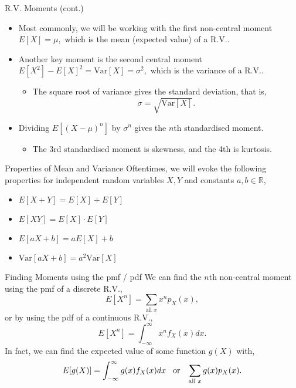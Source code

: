 \documentclass{beamer}
\begin{document}
\begin{frame}{R.V. Moments (cont.)}
    \begin{itemize}
        \item Most commonly, we will be working with the first non-central moment $E[X]=\mu,$ which is the mean (expected value) of a R.V..
        \item Another key moment is the second central moment $E[X^2]-E[X]^2 = \text{Var}[X] = \sigma^2,$ which is the variance of a R.V..
        \begin{itemize}
            \item The square root of variance gives the standard deviation, that is,
            $$
            \sigma = \sqrt{\text{Var}[X]}.
            $$
        \end{itemize}
        \item Dividing $E\left[ (X-\mu)^n \right]$ by $\sigma^n$ gives the $n$th standardised moment.
        \begin{itemize}
            \item The 3rd standardised moment is skewness, and the 4th is kurtosis.
        \end{itemize}
    \end{itemize}
\end{frame}

\begin{frame}{Properties of Mean and Variance}
    Oftentimes, we will evoke the following properties for independent random variables $X, Y$ and constants $a,b \in \mathbb{R}$,
    \begin{itemize}
        \item $E[X+Y] = E[X] + E[Y]$
        \item $E[XY] = E[X]\cdot E[Y]$
        \item $E[aX+b] = aE[X] + b$
        \item $\text{Var}[aX + b] = a^2\text{Var}[X]$
    \end{itemize}
\end{frame}

\begin{frame}{Finding Moments using the pmf / pdf}
    We can find the $n$th non-central moment using the pmf of a discrete R.V.,
    $$
    E[X^n] = \sum_{\text{all }x} x^n p_X(x),
    $$
    or by using the pdf of a continuous R.V.,
    $$
    E[X^n] = \int_{-\infty}^{\infty} x^n f_X(x) dx.
    $$
    In fact, we can find the expected value of some function $g(X)$ with,
    $$
    E[g(X)] = \int_{-\infty}^{\infty} g(x) f_X(x) dx \hspace{0.3cm}\text{or}\hspace{0.3cm} \sum_{\text{all }x} g(x)p_X(x).
    $$
\end{frame}
\end{document}
